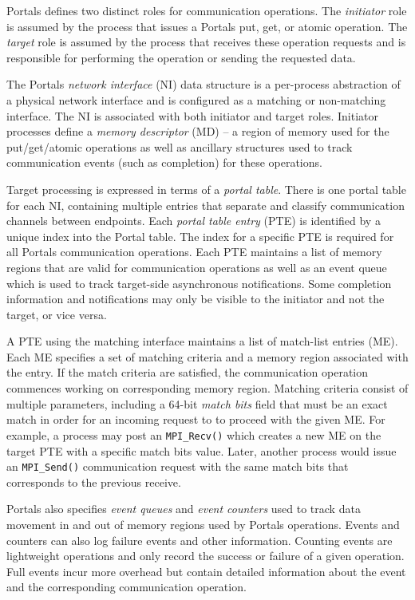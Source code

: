 Portals defines two distinct roles for communication operations. The {\em
  initiator} role is assumed by the process that issues a Portals put, get, or
atomic operation. The {\em target} role is assumed by the process that receives
these operation requests and is responsible for performing the operation or
sending the requested data.

The Portals {\em network interface} (NI) data structure is a per-process
abstraction of a physical network interface and is configured as a
matching or non-matching interface. The NI is associated with both
initiator and target roles. Initiator processes define a {\em memory
  descriptor} (MD) -- a region of memory used for the put/get/atomic
operations as well as ancillary structures used to track communication
events (such as completion) for these operations.

Target processing is expressed in terms of a {\em portal table}. There is one
portal table for each NI, containing multiple entries that separate and
classify communication channels between endpoints.  Each {\em portal table
  entry} (PTE) is identified by a unique index into the Portal table. The index
for a specific PTE is required for all Portals communication operations. Each
PTE maintains a list of memory regions that are valid for communication
operations as well as an event queue which is used to track target-side
asynchronous notifications.  Some completion information and notifications may
only be visible to the initiator and not the target, or vice versa.

A PTE using the matching interface maintains a list of match-list entries (ME).
Each ME specifies a set of matching criteria and a memory region associated
with the entry. If the match criteria are satisfied, the communication
operation commences working on corresponding memory region. Matching criteria
consist of multiple parameters, including a 64-bit {\em match bits} field
that must be an exact match in order for an incoming request to to proceed
with the given ME. For example, a process may post an {\tt MPI\_Recv()} which
creates a new ME on the target PTE with a specific match bits value. Later,
another process would issue an {\tt MPI\_Send()} communication request with
the same match bits that corresponds to the previous receive.

Portals also specifies {\em event queues} and {\em event counters}
used to track data movement in and out of memory regions used by Portals
operations. Events and counters can also log failure events and
other information. Counting events are lightweight operations and only
record the success or failure of a given operation. Full events incur
more overhead but contain detailed information about the event and
the corresponding communication operation.

